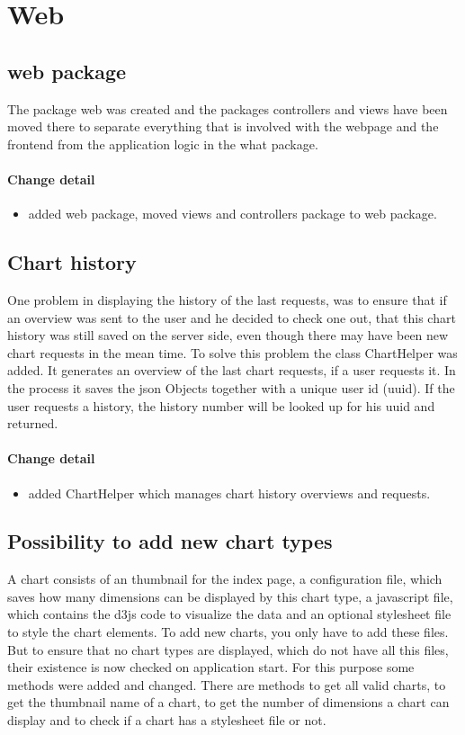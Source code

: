 \section{Web}
\subsection{web package}
The package web was created and the packages controllers and views have been moved there 
to separate everything that is involved with the webpage and the frontend from the application logic in the what package.

\paragraph{Change detail}
\begin{itemize}
  \item added web package, moved views and controllers package to web package.
\end{itemize}

\subsection{Chart history}
One problem in displaying the history of the last requests, was to ensure that if an overview was sent to the user and he decided to check one out,
 that this chart history was still saved on the server side, even though there may have been new chart requests in the mean time.
To solve this problem the class ChartHelper was added. It generates an overview of the last chart requests, 
if a user requests it. In the process it saves the json Objects together with a unique user id (uuid). 
If the user requests a history, the history number will be looked up for his uuid and returned.

\paragraph{Change detail}
\begin{itemize}
  \item added ChartHelper which manages chart history overviews and requests.
\end{itemize}

\subsection{Possibility to add new chart types}
A chart consists of an thumbnail for the index page, a configuration file, which saves how many dimensions can be displayed by this chart type,
a javascript file, which contains the d3js code to visualize the data and an optional stylesheet file to style the chart elements.
To add new charts, you only have to add these files.
But to ensure that no chart types are displayed, which do not have all this files, their existence is now checked on application start.
For this purpose some methods were added and changed. There are methods to get all valid charts, to get the thumbnail name of a chart,
to get the number of dimensions a chart can display and to check if a chart has a stylesheet file or not.

